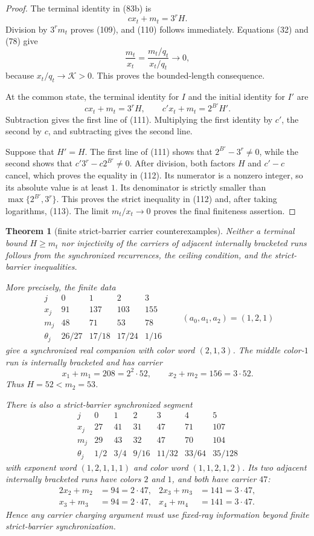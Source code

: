 \documentclass[11pt]{article}
\newtheorem{theorem}{Theorem}
\begin{document}
\begin{proof}
The terminal identity in (83b) is
\[
  cx_t+m_t=3^rH.
\]
Division by $3^rm_t$ proves (109), and (110) follows immediately.  Equations
(32) and (78) give
\[
  \frac{m_t}{x_t}
  =\frac{m_t/q_t}{x_t/q_t}\longrightarrow0,
\]
because $x_t/q_t\to\mathcal K>0$.  This proves the bounded-length
consequence.

At the common state, the terminal identity for $I$ and the initial identity
for $I'$ are
\[
  cx_t+m_t=3^rH,
  \qquad
  c'x_t+m_t=2^{B'}H'.
\]
Subtraction gives the first line of (111).  Multiplying the first identity
by $c'$, the second by $c$, and subtracting gives the second line.

Suppose that $H'=H$.  The first line of (111) shows that
$2^{B'}-3^r\neq0$, while the second shows that
$c'3^r-c2^{B'}\neq0$.  After division, both factors $H$ and $c'-c$ cancel,
which proves the equality in (112).  Its numerator is a nonzero integer, so
its absolute value is at least $1$.  Its denominator is strictly smaller
than $\max\{2^{B'},3^r\}$.  This proves the strict inequality in (112) and,
after taking logarithms, (113).  The limit $m_t/x_t\to0$ proves the final
finiteness assertion.
\end{proof}

\begin{theorem}[finite strict-barrier carrier counterexamples]
Neither a terminal bound $H\geq m_t$ nor injectivity of the carriers of
adjacent internally bracketed runs follows from the synchronized
recurrences, the ceiling condition, and the strict-barrier inequalities.

More precisely, the finite data
\[
\begin{array}{c|rrrr}
j&0&1&2&3\\ \hline
x_j&91&137&103&155\\
m_j&48&71&53&78\\
\theta_j&26/27&17/18&17/24&1/16
\end{array}
\qquad
(a_0,a_1,a_2)=(1,2,1)
\]
give a synchronized real companion with color word $(2,1,3)$.  The middle
color-$1$ run is internally bracketed and has carrier
\[
  x_1+m_1=208=2^2\cdot52,
  \qquad
  x_2+m_2=156=3\cdot52.
\]
Thus $H=52<m_2=53$.

There is also a strict-barrier synchronized segment
\[
\begin{array}{c|rrrrrr}
j&0&1&2&3&4&5\\ \hline
x_j&27&41&31&47&71&107\\
m_j&29&43&32&47&70&104\\
\theta_j&1/2&3/4&9/16&11/32&33/64&35/128
\end{array}
\]
with exponent word $(1,2,1,1,1)$ and color word $(1,1,2,1,2)$.
Its two adjacent internally bracketed runs have colors $2$ and $1$, and
both have carrier $47$:
\[
\begin{aligned}
  2x_2+m_2&=94=2\cdot47,
  &2x_3+m_3&=141=3\cdot47,\\
  x_3+m_3&=94=2\cdot47,
  &x_4+m_4&=141=3\cdot47.
\end{aligned}
\]
Hence any carrier charging argument must use fixed-ray information beyond
finite strict-barrier synchronization.
\end{theorem}
\end{document}
